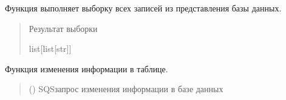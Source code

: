 \documentclass[letterpaper,10pt,russian]{sphinxmanual}
\begin{document}
\begin{fulllineitems}
\begin{fulllineitems}
\end{fulllineitems}


\begin{fulllineitems}
\label{\detokenize{database.sqlite3_interface.tables:database.sqlite3_interface.tables.table.Table.select_all}}
\pysigstartsignatures
{}
\pysigstopsignatures
\sphinxAtStartPar
Функция выполняет выборку всех записей из представления базы данных.
\begin{quote}\begin{description}
\sphinxAtStartPar
Результат выборки

\sphinxAtStartPar
list{[}list{[}str{]}{]}

\end{description}\end{quote}

\end{fulllineitems}


\begin{fulllineitems}
\label{\detokenize{database.sqlite3_interface.tables:database.sqlite3_interface.tables.table.Table.update}}
\pysigstartsignatures
{}
\pysigstopsignatures
\sphinxAtStartPar
Функция изменения информации в таблице.
\begin{quote}\begin{description}
\sphinxAtStartPar
{} () \textendash{} SQS\sphinxhyphen{}запрос изменения информации в базе данных

\end{description}\end{quote}

\end{fulllineitems}


\end{fulllineitems}
\end{document}
